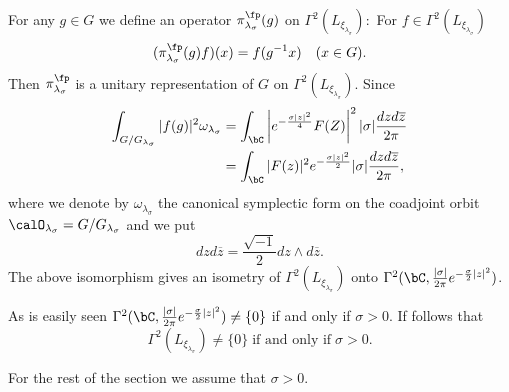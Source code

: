 For any $g \in G$ we define an operator $\pi_{\lambda_{\sigma}}^{\fp}(g)$ on $\Gamma^{2}(L_{\xi_{\lambda_{\sigma}}}):$ For $f \in \Gamma^{2}(L_{\xi_{\lambda_{\sigma}}})$
$$
(\pi_{\lambda_{\sigma}}^{\fp}(g)f)(x)=f(g^{-1}x) \quad (x \in G).
$$
Then $ \pi_{\lambda_{\sigma}}^{\fp}$ is a unitary representation of $G$ on $\Gamma^{2}(L_{\xi_{\lambda_{\sigma}}})$.  Since
\begin{align*}
\int_{G/G_{\lambda_{\sigma}}}|f(g)|^{2}\omega_{\lambda_{\sigma}} &= \int_{\bC}\left| e^{-\frac{\sigma|z|^{2}}{4}}F(Z)\right|^{2} |\sigma| \dfrac{dzd\overline{z}}{2\pi}\\
&= \int_{\bC}|F(z)|^{2} e^{-\frac{\sigma |z|^{2}}{2}}|\sigma| \dfrac{dzd\overline{z}}{2\pi},
\end{align*}
where we denote by $\omega_{\lambda_{\sigma}}$ the canonical symplectic form on the coadjoint orbit $\calO_{\lambda_{\sigma}}= G/G_{\lambda_{\sigma}}$ and we put
$$
dzd\overline{z}= \dfrac{\sqrt{-1}}{2}dz \wedge d\overline{z}.
$$
The above isomorphism gives an isometry of $\Gamma^{2}(L_{\xi_{\lambda_{\sigma}}})$ onto $\Gamma^{2}(\bC, \frac{|\sigma|}{2 \pi}\break e^{-\frac{\sigma}{2}|z|^{2}})$.

As is easily seen $\Gamma^{2}(\bC, \frac{|\sigma|}{2\pi}e^{-\frac{\sigma}{2}|z|^{2}}) \neq \{0\}$ if and only if $\sigma > 0$. If follows that
$$
\Gamma^{2}(L_{\xi_{\lambda_{\sigma}}})\neq \{0\}\; \text{if and only if}\; \sigma > 0.
$$

For the rest of the section we assume that  $\sigma > 0$.

